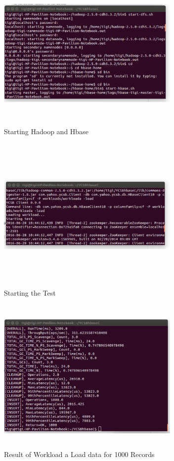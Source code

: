 \documentclass{bigdata}
\begin{document}
\begin{figure}
\includegraphics[height=3in, width=3.5in]{image2}
\caption{Starting Hadoop and Hbase}
\end{figure}
\begin{figure}
\includegraphics[height=3in, width=3.5in]{image1}
\caption{Starting the Test}
\end{figure}
\begin{figure}
\includegraphics[height=3in, width=3.5in]{image3}
\caption{Result of Workload a Load data  for 1000 Records}
\end{figure}
\end{document}
